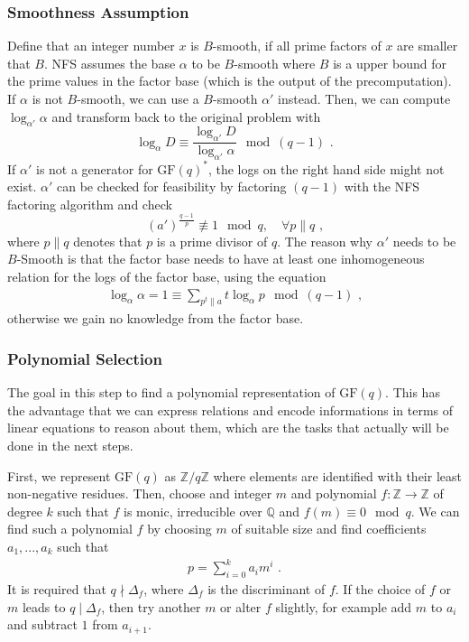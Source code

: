 \documentclass[paper=a4, fontsize=11pt]{scrartcl} %
\numberwithin{equation}{section} %
\numberwithin{figure}{section} %
\numberwithin{table}{section} %
\begin{document}
\subsubsection{Smoothness Assumption}
Define that an integer number $x$ is $B$-smooth, if all prime factors of $x$ are smaller that $B$. NFS assumes the base $\alpha$ to be $B$-smooth where $B$ is a upper bound for the prime values in the factor base (which is the output of the precomputation). If $\alpha$ is not $B$-smooth, we can use a $B$-smooth $\alpha'$ instead. Then, we can compute $\log_{\alpha'}\alpha$ and transform back to the original problem with
\begin{equation}
\log_\alpha D\equiv\frac{\log_{\alpha'}D}{\log_{\alpha'}\alpha}\mod (q-1)
\text{ .}
\end{equation}
If $\alpha'$ is not a generator for $\mathrm{GF}(q)^*$, the logs on the right hand side might not exist. $\alpha'$ can be checked for feasibility by factoring $(q-1)$ with the NFS factoring algorithm and check
\begin{equation}
(a')^{\frac{q-1}{p}} \not\equiv 1 \mod q,\quad\forall p\parallel q
\text{ ,}
\end{equation}
where $p\parallel q$ denotes that $p$ is a prime divisor of $q$. The reason why $\alpha'$ needs to be $B$-Smooth is that the factor base needs to have at least one inhomogeneous relation for the logs of the factor base, using the equation
\begin{eqnarray}
\label{eqn:assumption}
\log_\alpha\alpha = 1 \equiv \sum_{p^t\parallel a}t\log_\alpha p \mod (q-1)
\text{ ,}
\end{eqnarray}
otherwise we gain no knowledge from the factor base.

\subsubsection{Polynomial Selection}
The goal in this step to find a polynomial representation of $\mathrm{GF}(q)$. This has the advantage that we can express relations and encode informations in terms of linear equations to reason about them, which are the tasks that actually will be done in the next steps.

First, we represent $\mathrm{GF}(q)$ as $\mathbb{Z}/q\mathbb{Z}$ where elements are identified with their least non-negative residues. Then, choose and integer $m$ and polynomial $f:\mathbb{Z}\rightarrow\mathbb{Z}$ of degree $k$ such that $f$ is monic, irreducible over $\mathbb{Q}$ and $f(m)\equiv 0 \mod q$. We can find such a polynomial $f$ by choosing $m$ of suitable size and find coefficients $a_1,...,a_k$ such that
\begin{eqnarray}
p = \sum_{i=0}^{k}a_im^i
\text{ .}
\end{eqnarray}
It is required that $q\nmid\Delta_f$, where $\Delta_f$ is the discriminant of $f$. If the choice of $f$ or $m$ leads to $q\mid\Delta_f$, then try another $m$ or alter $f$ slightly, for example add $m$ to $a_i$ and subtract $1$ from $a_{i+1}$.
\end{document}
